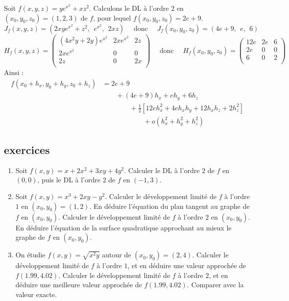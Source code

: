 \begin{exemple}
Soit $f(x,y,z) = ye^{x^2} + xz^2$. Calculons le DL à l'ordre $2$ en $(x_0,y_0,z_0) = (1,2,3)$ de $f$, pour lequel $f(x_0,y_0,z_0) = 2e + 9$.
$$J_f (x,y,z) = \left(2xye^{x^2} + z^2,\ \  e^{x^2},\ \  2xz \right)
\quad \text{ donc } \quad
J_f (x_0,y_0,z_0) = \left(4e + 9,\ \  e,\ \ 6 \right)$$
$$H_f(x,y,z)=
\begin{pmatrix}
(4x^2y+2y) e^{x^2} & 2xe^{x^2} & 2z \\
2xe^{x^2} &  0 & 0\\
2z &  0 & 2x \\
\end{pmatrix}
\quad \text{ donc } \quad
H_f(x_0,y_0,z_0)=
\begin{pmatrix}
12e & 2e & 6 \\
2e &  0 & 0\\
6 &  0 & 2\\
\end{pmatrix}$$
Ainsi :
\begin{align*}
f(x_0+h_x,y_0+h_y,z_0+h_z) 
& =2e + 9 \\
& \qquad +  (4e+9)h_x +  eh_y + 6h_z \\
& \qquad\qquad + \frac{1}{2}\left[ 12e h_x^2 + 4eh_xh_y +12h_xh_z +2h_z^2 \right] \\
& \qquad\qquad\qquad + o(h_x^2+h_y^2+h_z^2)
\end{align*}

\end{exemple}
 

\subsection{exercices}

\begin{enumerate}
     \item Soit $f(x,y) = x + 2x^2 + 3xy + 4y^2$. Calculer le DL à l'ordre $2$ de $f$ en $(0,0)$, puis le DL à l'ordre $2$ de $f$ en $(-1,3)$.

    \item Soit $f(x,y) = x^3  +2xy - y^2$. Calculer le développement limité de $f$ à l'ordre $1$ en $(x_0,y_0)=(1,2)$. En déduire l'équation du plan tangent au graphe de $f$ en $(x_0,y_0)$. Calculer le développement limité de $f$ à l'ordre $2$ en $(x_0,y_0)$. En déduire l'équation de la surface quadratique approchant au mieux le graphe de $f$ en $(x_0,y_0)$. 

    \item On étudie $f(x,y) = \sqrt{x^2y}$ autour de $(x_0,y_0)= (2,4)$.
   Calculer le développement limité de $f$ à l'ordre $1$, et en déduire une valeur approchée de $f(1.99,4.02)$. Calculer le développement limité de $f$ à l'ordre $2$, et en déduire une meilleure valeur approchée de $f(1.99,4.02)$. Comparer avec la valeur exacte.
 
\end{enumerate}



